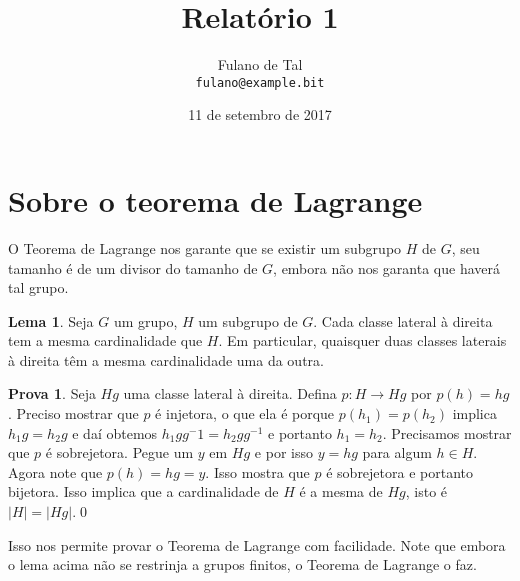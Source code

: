 \documentclass{article}
\author{Fulano de Tal\\
        \tt{fulano@example.bit}}
\title{Relatório 1}
\date{11 de setembro de 2017}
\theoremstyle{definition}
\newtheorem{lemma}[theorem]{Lema}
\theoremstyle{pf}
\newtheorem*{pf}{Prova}
\newcommand{\prf}{\begin{pf}}
\newcommand{\frp}{\qed\end{pf}}
\begin{document}
 \maketitle


\lstset{
  basicstyle=\small
}

\setlength{\parskip}{7pt}
\setlength{\parindent}{0pt}


\section{Sobre o teorema de Lagrange}

O Teorema de Lagrange nos garante que se existir um subgrupo $H$ de
$G$, seu tamanho é de um divisor do tamanho de $G$, embora não nos
garanta que haverá tal grupo.

\begin{lemma} \label{lemalagrange} Seja $G$ um grupo, $H$ um subgrupo 
de $G$. Cada classe lateral à direita tem a mesma cardinalidade que
$H$. Em particular, quaisquer duas classes laterais à direita têm a
mesma cardinalidade uma da outra.
\end{lemma} 

\prf Seja $Hg$ uma classe lateral à direita. Defina $p:H \to Hg$ por
$p(h) = hg$. Preciso mostrar que $p$ é injetora, o que ela é porque
$p(h_1) = p(h_2)$ implica $h_1 g = h_2g$ e daí obtemos $h_1 g g^-1=
h_2 g g^{-1}$ e portanto $h_1 = h_2$.  Precisamos mostrar que $p$ é
sobrejetora.  Pegue um $y$ em $Hg$ e por isso $y = hg$ para algum $h
\in H$.  Agora note que $p(h) = hg = y$. Isso mostra que $p$ é
sobrejetora e portanto bijetora.  Isso implica que a cardinalidade de
$H$ é a mesma de $Hg$, isto é $|H| = |Hg|$.\frp

Isso nos permite provar o Teorema de Lagrange com facilidade.  Note
que embora o lema acima não se restrinja a grupos finitos, o Teorema
de Lagrange o faz.
\end{document}
